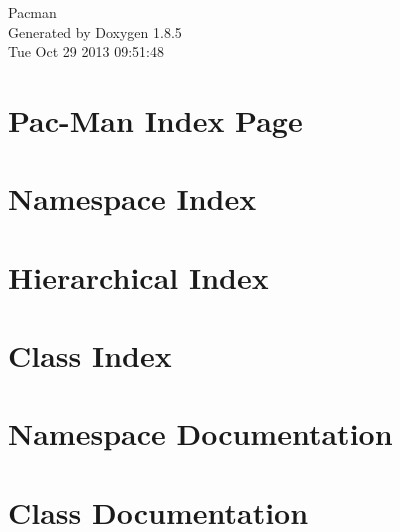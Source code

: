 \documentclass[twoside]{book}
\newcommand{\clearemptydoublepage}{%
  \newpage{\pagestyle{empty}\cleardoublepage}%
}
\begin{document}
\hypersetup{pageanchor=false}
\begin{titlepage}
\vspace*{7cm}
\begin{center}%
{\Large Pacman }\\
\vspace*{1cm}
{\large Generated by Doxygen 1.8.5}\\
\vspace*{0.5cm}
{\small Tue Oct 29 2013 09:51:48}\\
\end{center}
\end{titlepage}
\clearemptydoublepage
\tableofcontents
\clearemptydoublepage
{}
\hypersetup{pageanchor=true}

\chapter{Pac-\/\-Man Index Page}
\label{index}\hypertarget{index}{}
\chapter{Namespace Index}

\chapter{Hierarchical Index}

\chapter{Class Index}

\chapter{Namespace Documentation}

\chapter{Class Documentation}


























\newpage
{}
{}
\printindex
\end{document}
